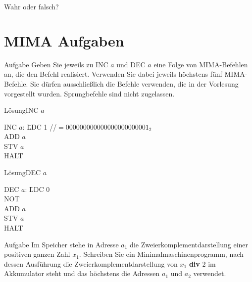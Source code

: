 \begin{frame}[t]{Wahr oder falsch?}
\end{frame}

%
\section{MIMA Aufgaben}
\begin{frame}{Aufgabe}
    Geben Sie jeweils zu INC $a$ und DEC $a$ eine Folge von MIMA-Befehlen an, die den Befehl realisiert. Verwenden Sie dabei jeweils höchstens fünf MIMA-Befehle. Sie dürfen ausschließlich die Befehle verwenden, die in der Vorlesung vorgestellt wurden. Sprungbefehle sind nicht zugelassen.
\end{frame}
\begin{frame}{Lösung}{INC $a$}
    \begin{tabbing}
		INC $a$: \; \= LDC 1 \quad  //$= 000000000000000000000001_2$ \\
				\> ADD $a$ \\
				\> STV $a$ \\
				\> HALT
	\end{tabbing}
\end{frame}
\begin{frame}{Lösung}{DEC $a$}
    \begin{tabbing}
		DEC $a$: \; \= LDC 0 \\
                \> NOT \\
				\> ADD $a$ \\
				\> STV $a$ \\
				\> HALT
	\end{tabbing}
\end{frame}

\begin{frame}{Aufgabe}
    Im Speicher stehe in Adresse $a_1$ die Zweierkomplementdarstellung einer positiven ganzen Zahl $x_1$. Schreiben Sie ein Minimalmaschinenprogramm, nach dessen Ausführung die Zweierkomplementdarstellung von $x_1$ \textbf{div} $2$ im Akkumulator steht und das höchstens die Adressen $a_1$ und $a_2$ verwendet.
\end{frame}


